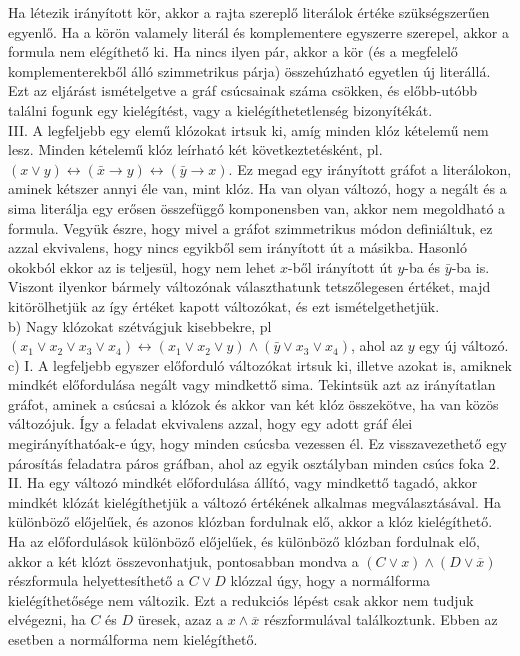 \begin{Answer}
	Ha létezik irányított kör, akkor a rajta szereplő literálok értéke szükségszerűen egyenlő. Ha a körön valamely literál és komplementere egyszerre szerepel, akkor a formula nem elégíthető ki. Ha nincs ilyen pár, akkor a kör (és a megfelelő komplementerekből álló szimmetrikus párja) összehúzható egyetlen új literállá. Ezt az eljárást ismételgetve a gráf csúcsainak száma csökken, és előbb-utóbb találni fogunk egy kielégítést, vagy a kielégíthetetlenség bizonyítékát.\\
	
	III. A legfeljebb egy elem\H u kl\'ozokat irtsuk ki, am\'ig minden kl\'oz k\'etelem\H u nem lesz. Minden k\'etelem\H u kl\'oz le\'irhat\'o k\'et k\"ovetkeztet\'esk\'ent, pl.\
	$(x \vee y) \leftrightarrow (\bar x \to y) \leftrightarrow (\bar y \to x)$. Ez megad egy ir\'any\'itott gr\'afot a liter\'alokon, aminek k\'etszer annyi \'ele van, mint kl\'oz. Ha van olyan v\'altoz\'o, hogy a neg\'alt \'es a sima liter\'alja egy er\H osen \"osszef\"ugg\H o komponensben van, akkor nem megoldhat\'o a formula. Vegy\"uk \'eszre, hogy mivel a gr\'afot szimmetrikus m\'odon defini\'altuk, ez azzal ekvivalens, hogy nincs egyikb\H ol sem ir\'any\'itott \'ut a m\'asikba. Hasonl\'o okokb\'ol ekkor az is teljes\"ul, hogy nem lehet $x$-b\H ol ir\'any\'itott \'ut $y$-ba \'es $\bar y$-ba is. Viszont ilyenkor b\'armely v\'altoz\'onak v\'alaszthatunk tetsz\H olegesen \'ert\'eket, majd kit\"or\"olhetj\"uk az \'igy \'ert\'eket kapott v\'altoz\'okat, \'es ezt ism\'etelgethetj\"uk.\\
	
	b) Nagy kl\'ozokat sz\'etv\'agjuk kisebbekre, pl $(x_1\vee x_2\vee x_3\vee x_4) \leftrightarrow (x_1\vee x_2\vee y) \wedge (\bar y \vee x_3\vee x_4)$, ahol az $y$ egy \'uj v\'altoz\'o.\\
	
	c) I. A legfeljebb egyszer el\H ofordul\'o v\'altoz\'okat irtsuk ki, illetve azokat is, amiknek mindk\'et el\H ofordul\'asa neg\'alt vagy mindkett\H o sima. Tekints\"uk azt az ir\'any\'itatlan gr\'afot, aminek a cs\'ucsai a kl\'ozok \'es akkor van k\'et kl\'oz \"osszek\"otve, ha van k\"oz\"os v\'altoz\'ojuk. \'Igy a feladat ekvivalens azzal, hogy egy adott gr\'af \'elei megir\'any\'ithat\'oak-e \'ugy, hogy minden cs\'ucsba vezessen \'el. Ez visszavezethet\H o egy p\'aros\'it\'as feladatra p\'aros gr\'afban, ahol az egyik oszt\'alyban minden cs\'ucs foka 2.\\
	
	II. Ha egy változó mindkét előfordulása állító, vagy mindkettő tagadó, akkor mindkét klózát kielégíthetjük a változó értékének alkalmas megválasztásával. Ha különböző előjelűek, és azonos klózban fordulnak elő, akkor a klóz kielégíthető. Ha az előfordulások különböző előjelűek, és különböző klózban fordulnak elő, akkor a két klózt összevonhatjuk, pontosabban mondva a $(C \vee x) \wedge (D \vee \overline{x})$ részformula helyettesíthető a $C \vee D$ klózzal úgy, hogy a normálforma kielégíthetősége nem változik. Ezt a redukciós lépést csak akkor nem tudjuk elvégezni, ha $C$ és $D$ üresek, azaz a $x \wedge \overline{x}$ részformulával találkoztunk. Ebben az esetben a normálforma nem kielégíthető.\\
	

\end{Answer}
